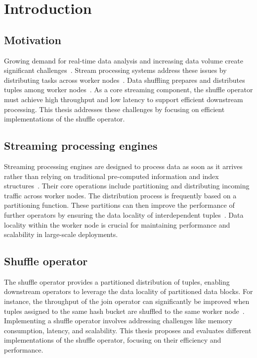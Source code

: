 
\chapter{Introduction}\label{chapter:introduction}

\section{Motivation}
Growing demand for real-time data analysis and increasing data volume create significant challenges~\parencite{Real-Time-Processing-of-big-data-streams,locality-aware-partitioning-in-parallel-db, join-processing-in-parallel-db}. Stream processing systems address these issues by distributing tasks across worker nodes~\parencite{Real-Time-Processing-of-big-data-streams, parallel-programming-assessment-for-stream-processing-applications}. Data shuffling prepares and distributes tuples among worker nodes~\parencite{RDMA-aware-Data-Shuffling-Operator}. As a core streaming component, the shuffle operator must achieve high throughput and low latency to support efficient downstream processing. This thesis addresses these challenges by focusing on efficient implementations of the shuffle operator.

\section{Streaming processing engines}
Streaming processing engines are designed to process data as soon as it arrives rather than relying on traditional pre-computed information and index structures~\parencite{Real-Time-Processing-of-big-data-streams}. Their core operations include partitioning and distributing incoming traffic across worker nodes. The distribution process is frequently based on a partitioning function. These partitions can then improve the performance of further operators by ensuring the data locality of interdependent tuples~\parencite{join-processing-in-parallel-db}. Data locality within the worker node is crucial for maintaining performance and scalability in large-scale deployments.

\section{Shuffle operator}
The shuffle operator provides a partitioned distribution of tuples, enabling downstream operators to leverage the data locality of partitioned data blocks. For instance, the throughput of the join operator can significantly be improved when tuples assigned to the same hash bucket are shuffled to the same worker node~\parencite{join-processing-in-parallel-db}. Implementing a shuffle operator involves addressing challenges like memory consumption, latency, and scalability. This thesis proposes and evaluates different implementations of the shuffle operator, focusing on their efficiency and performance.

